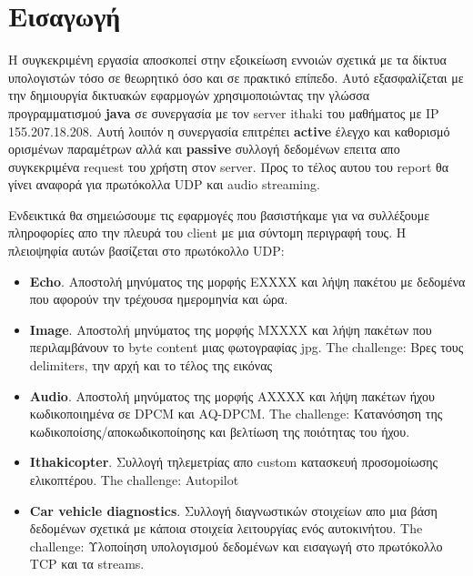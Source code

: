 \documentclass[hidelinks, 12pt, a4paper]{article}
\begin{document}
\sloppy %




\pagebreak
\tableofcontents
\pagebreak



\section{Εισαγωγή}

Η συγκεκριμένη εργασία αποσκοπεί στην εξοικείωση εννοιών σχετικά με τα δίκτυα υπολογιστών τόσο σε θεωρητικό όσο και σε πρακτικό επίπεδο. Αυτό εξασφαλίζεται με την δημιουργία δικτυακών εφαρμογών χρησιμοποιώντας την γλώσσα προγραμματισμού \textbf{java} σε συνεργασία με τον server ithaki του μαθήματος με IP 155.207.18.208. Αυτή λοιπόν η συνεργασία επιτρέπει \textbf{active} έλεγχο και καθορισμό ορισμένων παραμέτρων αλλά και \textbf{passive} συλλογή δεδομένων επειτα απο συγκεκριμένα request του χρήστη στον server. Προς το τέλος αυτου του report θα γίνει αναφορά για πρωτόκολλα UDP και audio streaming.

Ενδεικτικά θα σημειώσουμε τις εφαρμογές που βασιστήκαμε για να συλλέξουμε πληροφορίες απο την πλευρά του client με μια σύντομη περιγραφή τους. Η πλειοψηφία αυτών βασίζεται στο πρωτόκολλο UDP:
\begin{itemize}
    \item \textbf{Echo}.
        Αποστολή μηνύματος της μορφής ΕΧΧΧX και λήψη πακέτου με δεδομένα που αφορούν την τρέχουσα ημερομηνία και ώρα.
    \item \textbf{Image}.
        Αποστολή μηνύματος της μορφής ΜΧΧΧΧ και λήψη πακέτων που περιλαμβάνουν το byte content μιας φωτογραφίας jpg. The challenge: Βρες τους delimiters, την αρχή και το τέλος της εικόνας 
    \item \textbf{Audio}.
        Αποστολή μηνύματος της μορφής ΑΧΧΧΧ και λήψη πακέτων ήχου κωδικοποιημένα σε DPCM και AQ-DPCM. The challenge: Κατανόσηση της κωδικοποίσης/αποκωδικοποίησης και βελτίωση της ποιότητας του ήχου.
    \item \textbf{Ithakicopter}. Συλλογή τηλεμετρίας απο custom κατασκευή προσομοίωσης ελικοπτέρου. The challenge: Autopilot
    \item \textbf{Car vehicle diagnostics}. Συλλογή διαγνωστικών στοιχείων απο μια βάση δεδομένων σχετικά με κάποια στοιχεία λειτουργίας ενός αυτοκινήτου. The challenge: Υλοποίηση υπολογισμού δεδομένων και εισαγωγή στο πρωτόκολλο TCP και τα streams.
\end{itemize}
\end{document}
